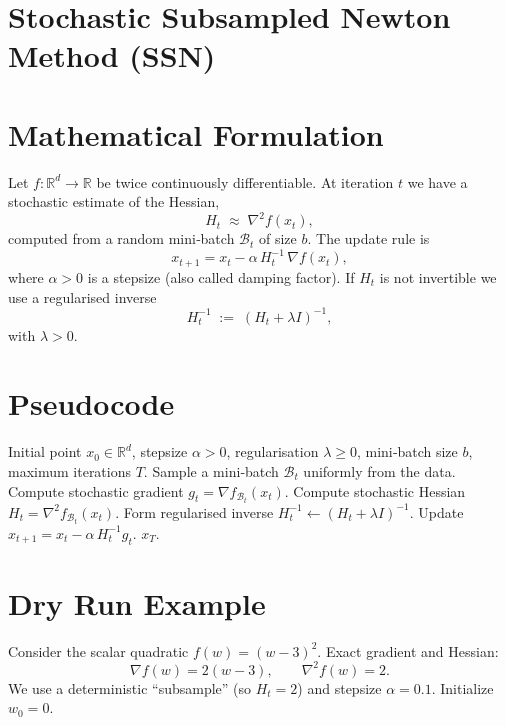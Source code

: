 \documentclass{article}
\begin{document}
\section*{Stochastic Subsampled Newton Method (SSN)}

\section*{Mathematical Formulation}
Let $f:\mathbb{R}^{d}\rightarrow\mathbb{R}$ be twice continuously differentiable.  
At iteration $t$ we have a stochastic estimate of the Hessian,
\[
H_{t}\;\approx\;\nabla^{2}f(x_{t}),
\]
computed from a random mini‑batch $\mathcal{B}_{t}$ of size $b$.  
The update rule is
\begin{equation}\label{eq:update}
x_{t+1}=x_{t}-\alpha\,H_{t}^{-1}\,\nabla f(x_{t}),
\end{equation}
where $\alpha>0$ is a stepsize (also called damping factor).  
If $H_{t}$ is not invertible we use a regularised inverse
\[
H_{t}^{-1}\;:=\;(H_{t}+\lambda I)^{-1},
\]
with $\lambda>0$.

\section*{Pseudocode}
\begin{algorithm}[H]
\caption{Stochastic Subsampled Newton (SSN)}
\begin{algorithmic}[1]
\Require Initial point $x_{0}\in\mathbb{R}^{d}$, stepsize $\alpha>0$, regularisation $\lambda\ge0$, mini‑batch size $b$, maximum iterations $T$.
    \State Sample a mini‑batch $\mathcal{B}_{t}$ uniformly from the data.
    \State Compute stochastic gradient $g_{t}= \nabla f_{\mathcal{B}_{t}}(x_{t})$.
    \State Compute stochastic Hessian $H_{t}= \nabla^{2} f_{\mathcal{B}_{t}}(x_{t})$.
    \State Form regularised inverse $H_{t}^{-1}\gets (H_{t}+\lambda I)^{-1}$.
    \State Update $x_{t+1}=x_{t}-\alpha\,H_{t}^{-1} g_{t}$.
\EndFor
\State \Return $x_{T}$.
\end{algorithmic}
\end{algorithm}

\section*{Dry Run Example}
Consider the scalar quadratic $f(w)=(w-3)^{2}$.  
Exact gradient and Hessian:
\[
\nabla f(w)=2(w-3),\qquad \nabla^{2}f(w)=2.
\]
We use a deterministic “subsample” (so $H_{t}=2$) and stepsize $\alpha=0.1$.  
Initialize $w_{0}=0$.
\end{document}
